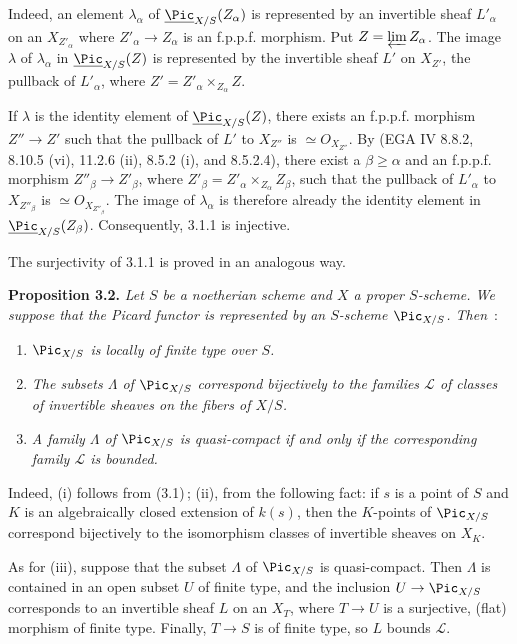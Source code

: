 Indeed, an element \(\lambda_\alpha\) of \(\underline{\Pic}_{X/S}(Z_\alpha)\) is represented by an invertible sheaf \(L'_\alpha\) on an \(X_{Z'_\alpha}\) where \(Z'_\alpha\to Z_\alpha\) is an f.p.p.f. morphism. Put \(Z=\varprojlim Z_\alpha\). The image \(\lambda\) of \(\lambda_\alpha\) in \(\underline{\Pic}_{X/S}(Z)\) is represented by the invertible sheaf \(L'\) on \(X_{Z'}\), the pullback of \(L'_\alpha\), where \(Z'=Z'_\alpha\times_{Z_\alpha}Z\).

If \(\lambda\) is the identity element of \(\underline{\Pic}_{X/S}(Z)\), there exists an f.p.p.f. morphism \(Z''\to Z'\) such that the pullback of \(L'\) to \(X_{Z''}\) is \(\simeq{O}_{X_{Z''}}\). By (EGA IV 8.8.2, 8.10.5 (vi), 11.2.6 (ii), 8.5.2 (i), and 8.5.2.4), there exist a \(\beta\geq\alpha\) and an f.p.p.f. morphism \(Z''_\beta\to Z'_\beta\), where \(Z'_\beta=Z'_\alpha\times_{Z_\alpha}Z_\beta\), such that the pullback of \(L'_\alpha\) to \(X_{Z''_\beta}\) is \(\simeq{O}_{X_{Z''_\beta}}\). The image of \(\lambda_\alpha\) is therefore already the identity element in \(\underline{\Pic}_{X/S}(Z_\beta)\). Consequently, 3.1.1 is injective.

The surjectivity of 3.1.1 is proved in an analogous way.

\textbf{Proposition 3.2.} \emph{Let \(S\) be a noetherian scheme and \(X\) a proper \(S\)-scheme. We suppose that the Picard functor is represented by an \(S\)-scheme \(\Pic_{X/S}\). Then}~:
\begin{enumerate}[label=(\roman*)]
\item \emph{\(\Pic_{X/S}\) is locally of finite type over \(S\).}
\item{}%
\emph{The subsets \(\Lambda\) of \(\Pic_{X/S}\) correspond bijectively to the families \(\mathscr L\) of classes of invertible sheaves on the fibers of \(X/S\).}
\item \emph{A family \(\Lambda\) of \(\Pic_{X/S}\) is quasi-compact if and only if the corresponding family \(\mathscr L\) is bounded.}
\end{enumerate}

Indeed, (i) follows from (3.1)\,; (ii), from the following fact: if \(s\) is a point of \(S\) and \(K\) is an algebraically closed extension of \(k(s)\), then the \(K\)-points of \(\Pic_{X/S}\) correspond bijectively to the isomorphism classes of invertible sheaves on \(X_K\).

As for (iii), suppose that the subset \(\Lambda\) of \(\Pic_{X/S}\) is quasi-compact. Then \(\Lambda\) is contained in an open subset \(U\) of finite type, and the inclusion \(U\to\Pic_{X/S}\) corresponds to an invertible sheaf \(L\) on an \(X_T\), where \(T\to U\) is a surjective, (flat) morphism of finite type. Finally, \(T\to S\) is of finite type, so \(L\) bounds \(\mathscr L\).

